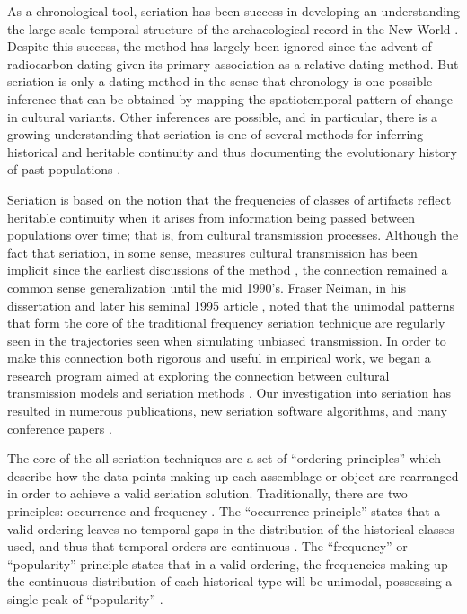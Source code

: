 \documentclass[graybox,natbib]{svmult}
\begin{document}
As a chronological tool, seriation has been success in developing an
understanding the large-scale temporal structure of the archaeological
record in the New World
\citep{Beals1945, Bluhm1951, Evans1955, Ford1949, Kidder1917, Mayer-Oakes1955, Meggers1957, Phillips1951, Rouse1939, Smith1950}.
Despite this success, the method has largely been ignored since the
advent of radiocarbon dating given its primary association as a relative
dating method. But seriation is only a dating method in the sense that
chronology is one possible inference that can be obtained by mapping the
spatiotemporal pattern of change in cultural variants. Other inferences
are possible, and in particular, there is a growing understanding that
seriation is one of several methods for inferring historical and
heritable continuity and thus documenting the evolutionary history of
past populations
\citetext{\citealp[e.g.,][]{Lipo1997Population}; \citealp{Lipo2000}; \citealp{Lipo2001}; \citealp{Lipo2001a}; \citealp{Lipo2005}; \citealp{lipomadsen1997}; \citealp{lipomadsendunnell2015}; \citealp{Neiman1995}; \citealp[Ch.
3]{OBrien1999b}; \citealp{Teltser1995}}.

Seriation is based on the notion that the frequencies of classes of
artifacts reflect heritable continuity when it arises from information
being passed between populations over time; that is, from cultural
transmission processes. Although the fact that seriation, in some sense,
measures cultural transmission has been implicit since the earliest
discussions of the method \citep[e.g.,][]{Kroeber1923}, the connection
remained a common sense generalization until the mid 1990's. Fraser
Neiman, in his dissertation \citep{Neiman1990} and later his seminal
1995 article \citep{Neiman1995}, noted that the unimodal patterns that
form the core of the traditional frequency seriation technique are
regularly seen in the trajectories seen when simulating unbiased
transmission. In order to make this connection both rigorous and useful
in empirical work, we began a research program aimed at exploring the
connection between cultural transmission models and seriation methods
\citep{Lipo1997Population}. Our investigation into seriation has
resulted in numerous publications, new seriation software algorithms,
and many conference papers
\citep{Lipo2008, Lipo2001neutrality, Lipo2001a, Lipo2005, lipomadsen1997, lipomadsendunnell2015, Madsen2014, madsenlipo2015b, Madsen2008, o2015design}.

The core of the all seriation techniques are a set of ``ordering
principles'' which describe how the data points making up each
assemblage or object are rearranged in order to achieve a valid
seriation solution. Traditionally, there are two principles: occurrence
and frequency \citep{Dunnell:1970aa, Rouse1967, Whitlam:1981vs}. The
``occurrence principle'' states that a valid ordering leaves no temporal
gaps in the distribution of the historical classes used, and thus that
temporal orders are continuous
\citep{dempsey1963statistical, rowe1959archaeological}. The
``frequency'' or ``popularity'' principle states that in a valid
ordering, the frequencies making up the continuous distribution of each
historical type will be unimodal, possessing a single peak of
``popularity'' \citep{Nelson1916}.
\end{document}
